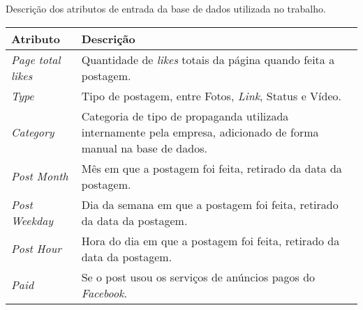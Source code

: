 
\begin{quadro}[!htb]
	\centering
	\caption{Descrição dos atributos de entrada da base de dados utilizada no trabalho.\label{qua:descBaseFacebookEntrada}}
	\small
	\begin{tabular}{|p{7cm}|p{7cm}|}
        		\hline
		\textbf{Atributo} & \textbf{Descrição} \\ \hline
		\textit{Page total likes} & Quantidade de \textit{likes} totais da página quando feita a postagem. \\ \hline
		\textit{Type} & Tipo de postagem, entre Fotos, \textit{Link}, Status e Vídeo. \\ \hline
		\textit{Category} & Categoria de tipo de propaganda utilizada internamente pela empresa, adicionado de forma manual na base de dados. \\ \hline
		\textit{Post Month} & Mês em que a postagem foi feita, retirado da data da postagem. \\ \hline
		\textit{Post Weekday} & Dia da semana em que a postagem foi feita, retirado da data da postagem. \\ \hline
		\textit{Post Hour} & Hora do dia em que a postagem foi feita, retirado da data da postagem. \\ \hline
		\textit{Paid} & Se o post usou os serviços de anúncios pagos do \textit{Facebook}. \\ \hline
    \end{tabular}
\end{quadro}